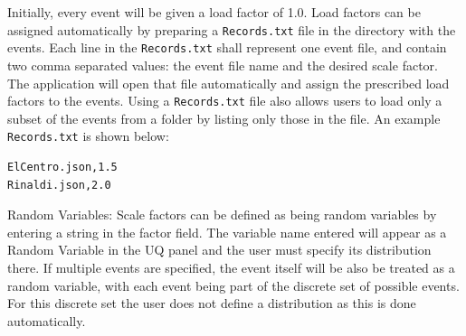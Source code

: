 Initially, every
event will be given a load factor of 1.0. Load factors can be assigned automatically by preparing a \texttt{Records.txt} file in the directory with the events. Each line in the \texttt{Records.txt} shall represent one event file, and contain two comma separated values: the event file name and the desired scale factor. The application will open that file automatically and assign the prescribed load factors to the events. Using a \texttt{Records.txt} file also allows users to load only a subset of the events from a folder by listing only those in the file. An example \texttt{Records.txt} is shown below:

\begin{verbatim}
ElCentro.json,1.5
Rinaldi.json,2.0
\end{verbatim}

Random Variables: Scale factors can be defined as being random variables by entering a string in the factor field. The variable name entered will appear as a Random Variable in the UQ panel and the user must specify its distribution there. If multiple
events are specified, the event itself will be also be treated as a random
variable, with each event being part of the discrete set of possible
events. For this discrete set the user does not define a distribution as this is done automatically.
